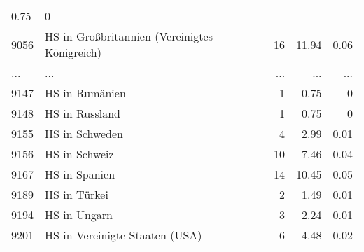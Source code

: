 \begin{longtable}{lXrrr}
          \num[round-mode=places,round-precision=2]{0,75} &
          \num[round-mode=places,round-precision=2]{0} \\
        9056 & \multicolumn{1}{X}{HS in Großbritannien (Vereinigtes Königreich)} & %
          \num{16} &
          \num[round-mode=places,round-precision=2]{11,94} &
          \num[round-mode=places,round-precision=2]{0,06} \\
       ... & ... & ... & ... & ... \\
        9147 & \multicolumn{1}{X}{HS in Rumänien} & %
          \num{1} &
          \num[round-mode=places,round-precision=2]{0,75} &
          \num[round-mode=places,round-precision=2]{0} \\

        9148 & \multicolumn{1}{X}{HS in Russland} & %
          \num{1} &
          \num[round-mode=places,round-precision=2]{0,75} &
          \num[round-mode=places,round-precision=2]{0} \\

        9155 & \multicolumn{1}{X}{HS in Schweden} & %
          \num{4} &
          \num[round-mode=places,round-precision=2]{2,99} &
          \num[round-mode=places,round-precision=2]{0,01} \\

        9156 & \multicolumn{1}{X}{HS in Schweiz} & %
          \num{10} &
          \num[round-mode=places,round-precision=2]{7,46} &
          \num[round-mode=places,round-precision=2]{0,04} \\

        9167 & \multicolumn{1}{X}{HS in Spanien} & %
          \num{14} &
          \num[round-mode=places,round-precision=2]{10,45} &
          \num[round-mode=places,round-precision=2]{0,05} \\

        9189 & \multicolumn{1}{X}{HS in Türkei} & %
          \num{2} &
          \num[round-mode=places,round-precision=2]{1,49} &
          \num[round-mode=places,round-precision=2]{0,01} \\

        9194 & \multicolumn{1}{X}{HS in Ungarn} & %
          \num{3} &
          \num[round-mode=places,round-precision=2]{2,24} &
          \num[round-mode=places,round-precision=2]{0,01} \\

        9201 & \multicolumn{1}{X}{HS in Vereinigte Staaten (USA)} & %
          \num{6} &
          \num[round-mode=places,round-precision=2]{4,48} &
          \num[round-mode=places,round-precision=2]{0,02} \\


\end{longtable}
